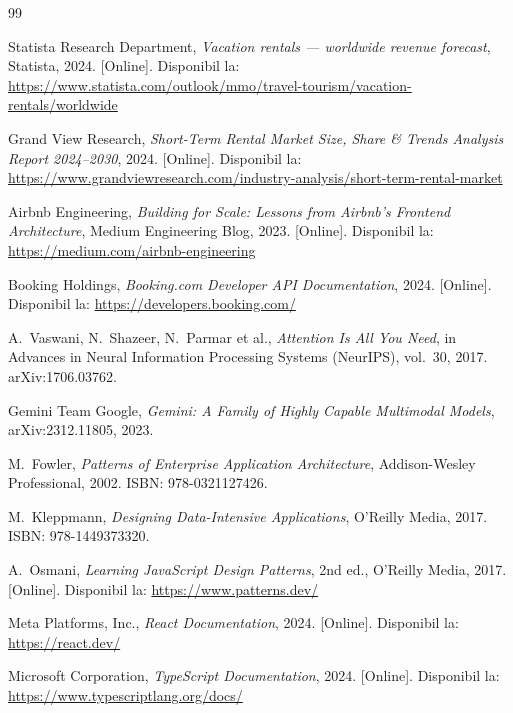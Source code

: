 \documentclass[12pt,a4paper,oneside]{report}
\begin{document}
\begin{thebibliography}{99}

Statista Research Department, \textit{Vacation rentals — worldwide revenue forecast}, Statista, 2024. [Online]. Disponibil la: \url{https://www.statista.com/outlook/mmo/travel-tourism/vacation-rentals/worldwide}

Grand View Research, \textit{Short-Term Rental Market Size, Share \& Trends Analysis Report 2024–2030}, 2024. [Online]. Disponibil la: \url{https://www.grandviewresearch.com/industry-analysis/short-term-rental-market}

Airbnb Engineering, \textit{Building for Scale: Lessons from Airbnb's Frontend Architecture}, Medium Engineering Blog, 2023. [Online]. Disponibil la: \url{https://medium.com/airbnb-engineering}

Booking Holdings, \textit{Booking.com Developer API Documentation}, 2024. [Online]. Disponibil la: \url{https://developers.booking.com/}

A.~Vaswani, N.~Shazeer, N.~Parmar et al., \textit{Attention Is All You Need}, in Advances in Neural Information Processing Systems (NeurIPS), vol.~30, 2017. arXiv:1706.03762.

Gemini Team Google, \textit{Gemini: A Family of Highly Capable Multimodal Models}, arXiv:2312.11805, 2023.

M.~Fowler, \textit{Patterns of Enterprise Application Architecture}, Addison-Wesley Professional, 2002. ISBN: 978-0321127426.

M.~Kleppmann, \textit{Designing Data-Intensive Applications}, O'Reilly Media, 2017. ISBN: 978-1449373320.

A.~Osmani, \textit{Learning JavaScript Design Patterns}, 2nd ed., O'Reilly Media, 2017. [Online]. Disponibil la: \url{https://www.patterns.dev/}

Meta Platforms, Inc., \textit{React Documentation}, 2024. [Online]. Disponibil la: \url{https://react.dev/}

Microsoft Corporation, \textit{TypeScript Documentation}, 2024. [Online]. Disponibil la: \url{https://www.typescriptlang.org/docs/}


\end{thebibliography}
\end{document}
